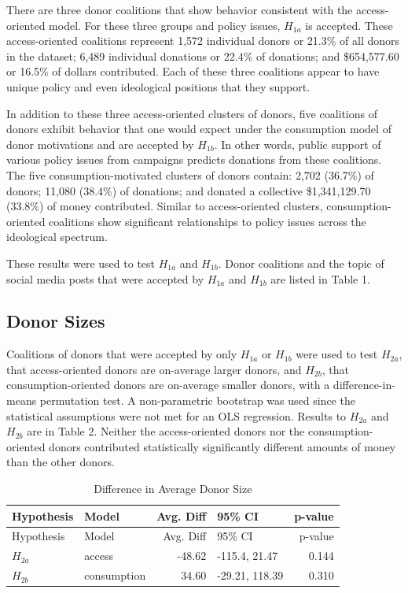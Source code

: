 \documentclass[12pt,]{article}
\begin{document}
There are three donor coalitions that show behavior consistent with the
access-oriented model. For these three groups and policy issues,
\(H_{1a}\) is accepted. These access-oriented coalitions represent 1,572
individual donors or 21.3\% of all donors in the dataset; 6,489
individual donations or 22.4\% of donations; and \$654,577.60 or 16.5\%
of dollars contributed. Each of these three coalitions appear to have
unique policy and even ideological positions that they support.

In addition to these three access-oriented clusters of donors, five
coalitions of donors exhibit behavior that one would expect under the
consumption model of donor motivations and are accepted by \(H_{1b}\).
In other words, public support of various policy issues from campaigns
predicts donations from these coalitions. The five consumption-motivated
clusters of donors contain: 2,702 (36.7\%) of donors; 11,080 (38.4\%) of
donations; and donated a collective \$1,341,129.70 (33.8\%) of money
contributed. Similar to access-oriented clusters, consumption-oriented
coalitions show significant relationships to policy issues across the
ideological spectrum.

These results were used to test \(H_{1a}\) and \(H_{1b}\). Donor
coalitions and the topic of social media posts that were accepted by
\(H_{1a}\) and \(H_{1b}\) are listed in Table 1.

\hypertarget{donor-sizes}{%
\subsection{Donor Sizes}\label{donor-sizes}}

Coalitions of donors that were accepted by only \(H_{1a}\) or \(H_{1b}\)
were used to test \(H_{2a}\), that access-oriented donors are on-average
larger donors, and \(H_{2b}\), that consumption-oriented donors are
on-average smaller donors, with a difference-in-means permutation test.
A non-parametric bootstrap was used since the statistical assumptions
were not met for an OLS regression. Results to \(H_{2a}\) and \(H_{2b}\)
are in Table 2. Neither the access-oriented donors nor the
consumption-oriented donors contributed statistically significantly
different amounts of money than the other donors.

\begin{longtable}[]{@{}llrlr@{}}
\caption{Difference in Average Donor Size}\tabularnewline
\toprule
Hypothesis & Model & Avg. Diff & 95\% CI & p-value \\
\midrule
\endfirsthead
\toprule
Hypothesis & Model & Avg. Diff & 95\% CI & p-value \\
\midrule
\endhead
\(H_{2a}\) & access & -48.62 & -115.4, 21.47 & 0.144 \\
\(H_{2b}\) & consumption & 34.60 & -29.21, 118.39 & 0.310 \\
\bottomrule
\end{longtable}
\end{document}
